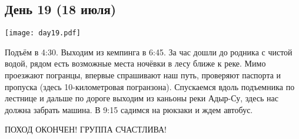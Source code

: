 \graphicspath{{Pictures/Chapter5/Day19}}



\subsection{День 19 (18 июля)}\label{subsec:Day19}
    \parbox[c]{\textwidth}{%
        \texttt{[image: day19.pdf]}\label{fig:Day19_map}%
    }
    \vspace{0.8cm}

Подъём в 4:30. Выходим из кемпинга в 6:45. За час дошли до родника с чистой водой, рядом есть возможные места ночёвки в лесу ближе к реке. Мимо проезжают погранцы, впервые спрашивают наш путь, проверяют паспорта и пропуска (здесь 10-километровая погранзона). Спускаемся вдоль подъемника по лестнице и дальше по дороге выходим из каньоны реки Адыр-Су, здесь нас должна забрать машина. В 9:15 садимся на рюкзаки и ждем автобус.

ПОХОД ОКОНЧЕН! ГРУППА СЧАСТЛИВА!








    \FloatBarrier
